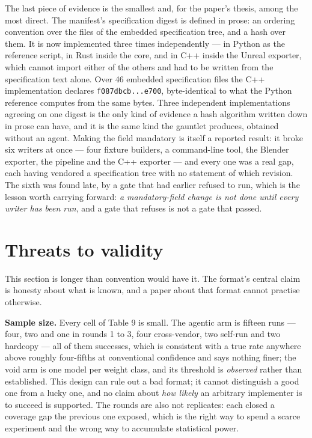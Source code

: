 \documentclass[10pt,twocolumn,letterpaper]{article}
\newcommand{\code}[1]{\texttt{\small #1}}
\begin{document}
The last piece of evidence is the smallest and, for the paper's thesis, among the most direct. The manifest's specification digest is defined in prose: an ordering convention over the files of the embedded specification tree, and a hash over them. It is now implemented three times independently --- in Python as the reference script, in Rust inside the core, and in C++ inside the Unreal exporter, which cannot import either of the others and had to be written from the specification text alone. Over 46 embedded specification files the C++ implementation declares \code{f087dbcb...e700}, byte-identical to what the Python reference computes from the same bytes. Three independent implementations agreeing on one digest is the only kind of evidence a hash algorithm written down in prose can have, and it is the same kind the gauntlet produces, obtained without an agent. Making the field mandatory is itself a reported result: it broke six writers at once --- four fixture builders, a command-line tool, the Blender exporter, the pipeline and the C++ exporter --- and every one was a real gap, each having vendored a specification tree with no statement of which revision. The sixth was found late, by a gate that had earlier refused to run, which is the lesson worth carrying forward: \emph{a mandatory-field change is not done until every writer has been run}, and a gate that refuses is not a gate that passed.

\section{Threats to validity}

This section is longer than convention would have it. The format's central claim is honesty about what is known, and a paper about that format cannot practise otherwise.

\textbf{Sample size.} Every cell of Table 9 is small. The agentic arm is fifteen runs --- four, two and one in rounds 1 to 3, four cross-vendor, two self-run and two hardcopy --- all of them successes, which is consistent with a true rate anywhere above roughly four-fifths at conventional confidence and says nothing finer; the void arm is one model per weight class, and its threshold is \emph{observed} rather than established. This design can rule out a bad format; it cannot distinguish a good one from a lucky one, and no claim about \emph{how likely} an arbitrary implementer is to succeed is supported. The rounds are also not replicates: each closed a coverage gap the previous one exposed, which is the right way to spend a scarce experiment and the wrong way to accumulate statistical power.
\end{document}
